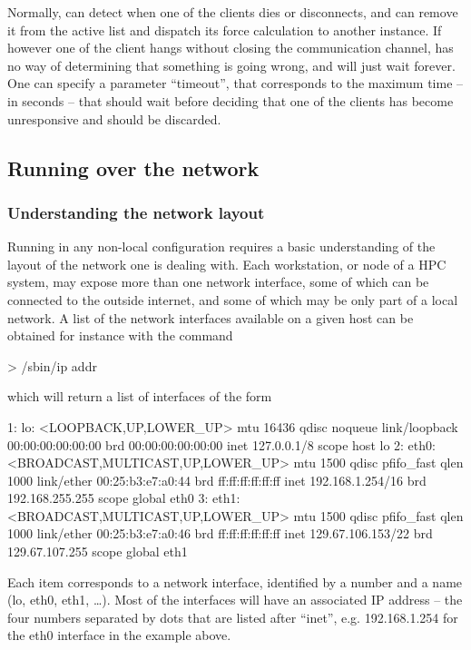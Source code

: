 \documentclass[11pt,english,fleqn]{report}
\newenvironment{code}{%
\footnotesize 
\verbatim
}{
\endverbatim
\normalsize
}
\begin{document}
Normally, \ipi can detect when one of the clients dies or disconnects,
and can remove it from the active list and dispatch its force calculation
to another instance. If however one of the client hangs without 
closing the communication channel, \ipi has no way of determining that
something is going wrong, and will just wait forever. One can 
specify a parameter ``timeout'', that corresponds to the maximum time -- in 
seconds -- that \ipi should wait before deciding that one of the clients
has become unresponsive and should be discarded.

\subsection{Running \ipi over the network}

\subsubsection{Understanding the network layout}

Running \ipi in any non-local configuration requires a basic understanding
of the layout of the network one is dealing with. Each workstation, or node
of a HPC system, may expose more than one network interface, some of which
can be connected to the outside internet, and some of which may be only part
of a local network. A list of the network interfaces available on a given host
can be obtained for instance with the command

\begin{code}
> /sbin/ip addr
\end{code}

\noindent which will return a list of interfaces of the form

\begin{code}
1: lo: <LOOPBACK,UP,LOWER_UP> mtu 16436 qdisc noqueue 
    link/loopback 00:00:00:00:00:00 brd 00:00:00:00:00:00
    inet 127.0.0.1/8 scope host lo
2: eth0: <BROADCAST,MULTICAST,UP,LOWER_UP> mtu 1500 qdisc pfifo_fast qlen 1000
    link/ether 00:25:b3:e7:a0:44 brd ff:ff:ff:ff:ff:ff
    inet 192.168.1.254/16 brd 192.168.255.255 scope global eth0
3: eth1: <BROADCAST,MULTICAST,UP,LOWER_UP> mtu 1500 qdisc pfifo_fast qlen 1000
    link/ether 00:25:b3:e7:a0:46 brd ff:ff:ff:ff:ff:ff
    inet 129.67.106.153/22 brd 129.67.107.255 scope global eth1
\end{code}

Each item corresponds to a network interface, identified by a number and a name (lo, eth0, eth1, \ldots).
Most of the interfaces will have an associated IP address -- the four numbers separated by dots
that are listed after ``inet'', e.g. 192.168.1.254 for the eth0 interface in the example above.
\end{document}
